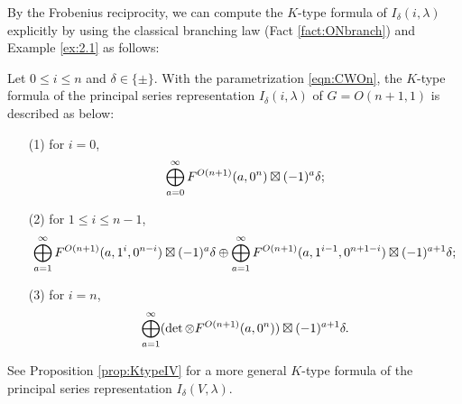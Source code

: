 By the Frobenius reciprocity,
 we can compute the $K$-type formula of $I_{\delta}(i,\lambda)$
 explicitly by using the classical branching law 
 (Fact \ref{fact:ONbranch})
 and Example \ref{ex:2.1} as follows:  
\begin{lemma}
\label{lem:KtypeIi}
Let $0 \le i \le n$ and $\delta \in\{\pm\}$.  
With the parametrization \eqref{eqn:CWOn}, 
 the 
$K$-type formula
 of the principal series representation $I_{\delta}(i,\lambda)$
 of $G=O(n+1,1)$ is described 
 as below:
\begin{enumerate}
\item[{\rm{(1)}}] 
 for $i=0$, 
\[
\bigoplus_{a=0}^{\infty} F^{{O(n+1)}}({a,0^n})
  \boxtimes
  (-1)^a \delta;
\]
\item[{\rm{(2)}}]
for $1 \le i \le n-1$, 
\[
  \bigoplus_{a=1}^{\infty} F^{{O(n+1)}}({a,1^i,0^{n-i}})
  \boxtimes
  (-1)^a \delta
  \oplus
  \bigoplus_{a=1}^{\infty} F^{{O(n+1)}}({a,1^{i-1},0^{n+1-i}})
  \boxtimes
  (-1)^{a+1} \delta;
\]
\item[{\rm{(3)}}] 
for $i=n$, 
\[
  \bigoplus_{a=1}^{\infty} (\det \otimes F^{{O(n+1)}}({a,0^n}))
  \boxtimes
  (-1)^{a+1} \delta.  
\]
\end{enumerate}
\end{lemma}
See Proposition \ref{prop:KtypeIV} for a more general $K$-type formula
 of the principal series representation $I_{\delta}(V,\lambda)$.  


